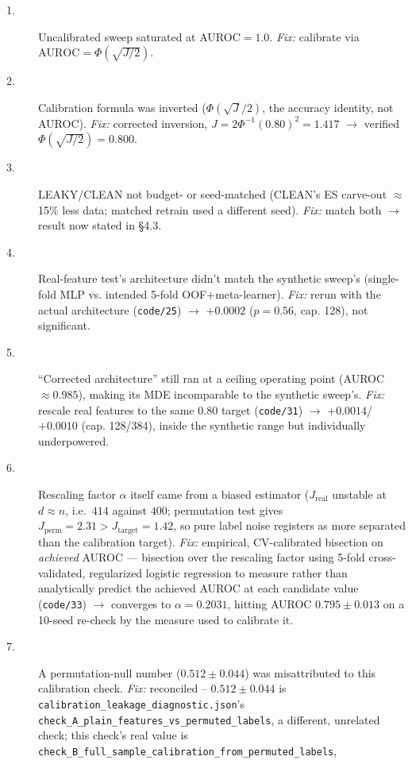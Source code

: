 \documentclass[10pt]{article} %
\begin{document}
\begin{description}
\item[1.] Uncalibrated sweep saturated at AUROC$=1.0$. \textit{Fix:}
  calibrate via $\text{AUROC}=\Phi(\sqrt{J/2})$.
\item[2.] Calibration formula was inverted ($\Phi(\sqrt J/2)$, the
  accuracy identity, not AUROC). \textit{Fix:} corrected inversion,
  $J=2\Phi^{-1}(0.80)^2=1.417$ $\rightarrow$ verified
  $\Phi(\sqrt{J/2})=0.800$.
\item[3.] LEAKY/CLEAN not budget- or seed-matched (CLEAN's ES carve-out
  $\approx$15\% less data; matched retrain used a different seed).
  \textit{Fix:} match both $\rightarrow$ result now stated in §4.3.
\item[4.] Real-feature test's architecture didn't match the synthetic
  sweep's (single-fold MLP vs. intended 5-fold OOF+meta-learner).
  \textit{Fix:} rerun with the actual architecture (\texttt{code/25})
  $\rightarrow$ $+0.0002$ ($p=0.56$, cap. 128), not significant.
\item[5.] ``Corrected architecture'' still ran at a ceiling operating
  point (AUROC$\approx0.985$), making its MDE incomparable to the
  synthetic sweep's. \textit{Fix:} rescale real features to the same
  $0.80$ target (\texttt{code/31}) $\rightarrow$ $+0.0014$/$+0.0010$
  (cap. 128/384), inside the synthetic range but individually
  underpowered.
\item[6.] Rescaling factor $\alpha$ itself came from a biased estimator
  ($J_{\text{real}}$ unstable at $d\approx n$, i.e.\ $414$ against $400$;
  permutation test gives $J_{\text{perm}}=2.31 > J_{\text{target}}=1.42$, so
  pure label noise registers as more separated than the calibration target).
  \textit{Fix:} empirical, CV-calibrated bisection on \emph{achieved} AUROC
  --- bisection over the rescaling factor using 5-fold cross-validated,
  regularized logistic regression to measure rather than analytically predict
  the achieved AUROC at each candidate value (\texttt{code/33})
  $\rightarrow$ converges to $\alpha=0.2031$, hitting AUROC $0.795\pm0.013$
  on a 10-seed re-check by the measure used to calibrate it.
\item[7.] A permutation-null number ($0.512\pm0.044$) was misattributed
  to this calibration check. \textit{Fix:} reconciled -- $0.512\pm0.044$
  is \texttt{calibration\_leakage\_diagnostic.json}'s
  \texttt{check\_A\_plain\_features\_vs\_permuted\_labels}, a different,
  unrelated check; this check's real value is
  \texttt{check\_B\_full\_sample\_calibration\_from\_permuted\_labels},

\end{description}
\end{document}
